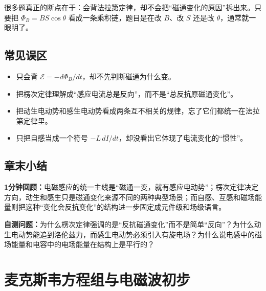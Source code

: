 \documentclass[lang=cn,11pt]{elegantbook}
\newcommand{\summaryline}[1]{\par\noindent\textbf{1分钟回顾：}#1\par}
\newcommand{\chapterselfcheck}[1]{\par\noindent\textbf{自测问题：}#1\par}
\begin{document}
\begin{remark}
很多题真正的断点在于：会背法拉第定律，却不会把“磁通变化的原因”拆出来。只要把
 \(\Phi_B=BS\cos\theta\) 
看成一条乘积链，题目是在改 \(B\)、改 \(S\) 还是改 \(\theta\)，通常就一眼明了。
\end{remark}

\section{常见误区}

\begin{itemize}
 \item 只会背 \(\mathcal{E}=-d\Phi_B/dt\)，却不先判断磁通为什么变。
 \item 把楞次定律理解成“感应电流总是反向”，而不是“总反抗原磁通变化”。
 \item 把动生电动势和感生电动势看成两条互不相关的规律，忘了它们都统一在法拉第定律里。
 \item 只把自感当成一个符号 \(-L\,dI/dt\)，却没看出它体现了电流变化的“惯性”。
\end{itemize}

\section{章末小结}

\summaryline{电磁感应的统一主线是“磁通一变，就有感应电动势”；楞次定律决定方向，动生和感生只是磁通变化来源不同的两种典型场景；而自感、互感和磁场能量则把这种“变化会反抗变化”的结构进一步固定成元件级和场级语言。}
\chapterselfcheck{为什么楞次定律强调的是“反抗磁通变化”而不是简单“反向”？为什么动生电动势能追到洛伦兹力，而感生电动势必须引入有旋电场？为什么说电感中的磁场能量和电容中的电场能量在结构上是平行的？}

\chapter{麦克斯韦方程组与电磁波初步}
\end{document}
